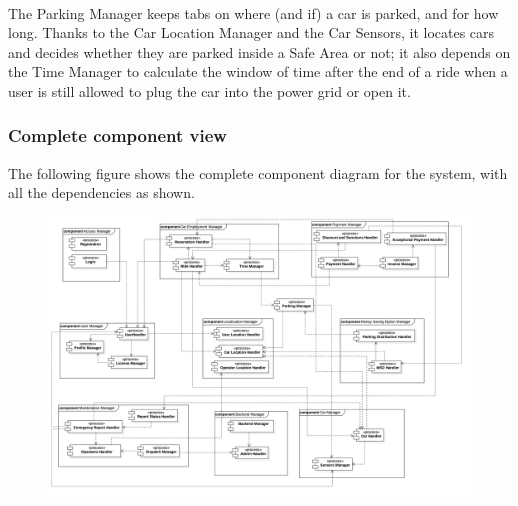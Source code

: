 		\paragraph{} The Parking Manager keeps tabs on where (and if) a car is parked, and for how long. Thanks to the Car Location Manager and the Car Sensors, it locates cars and decides whether they are parked inside a Safe Area or not; it also depends on the Time Manager to calculate the window of time after the end of a ride when a user is still allowed to plug the car into the power grid or open it.
\FloatBarrier

	\subsubsection{Complete component view}
	
	The following figure shows the complete component diagram for the system, with all the dependencies as shown. 
	
		\begin{figure}[h]
				\includegraphics[scale=0.1, center]{img/component_diagrams/10_complete_component_view.png}
			\end{figure}
			
\FloatBarrier
